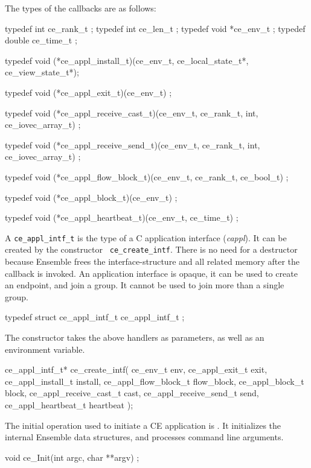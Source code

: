 The types of the callbacks are as follows:
\begin{codebox}
typedef int         ce_rank_t ;
typedef int         ce_len_t ;
typedef void       *ce_env_t ;
typedef double      ce_time_t ;

typedef void (*ce_appl_install_t)(ce_env_t, ce_local_state_t*, ce_view_state_t*);

typedef void (*ce_appl_exit_t)(ce_env_t) ;

typedef void (*ce_appl_receive_cast_t)(ce_env_t, ce_rank_t, int, ce_iovec_array_t) ;

typedef void (*ce_appl_receive_send_t)(ce_env_t, ce_rank_t, int, ce_iovec_array_t) ;

typedef void (*ce_appl_flow_block_t)(ce_env_t, ce_rank_t, ce_bool_t) ;

typedef void (*ce_appl_block_t)(ce_env_t) ;

typedef void (*ce_appl_heartbeat_t)(ce_env_t, ce_time_t) ;
\end{codebox}


A {\tt ce\_appl\_intf\_t} is the type of a C application interface
({\it cappl}).  It can be created by the constructor {\tt
ce\_create\_intf}. There is no need for a destructor because Ensemble
frees the interface-structure and all related memory after the 
callback is invoked. An application interface is opaque, it can be
used to create an endpoint, and join a group. It cannot be used to 
join more than a single group.
\begin{codebox}
typedef struct ce_appl_intf_t ce_appl_intf_t ;
\end{codebox}


The constructor takes the above handlers as parameters, as well as
an environment variable. 

\begin{codebox}
ce_appl_intf_t*
ce_create_intf(
    ce_env_t env, 
    ce_appl_exit_t exit,
    ce_appl_install_t install,
    ce_appl_flow_block_t flow_block,
    ce_appl_block_t block,
    ce_appl_receive_cast_t cast,
    ce_appl_receive_send_t send,
    ce_appl_heartbeat_t heartbeat
);
\end{codebox}

The initial operation used to initiate a CE application is
. It initializes the internal Ensemble data structures, and
processes command line arguments.

\begin{codebox}
void ce_Init(int argc, char **argv) ;
\end{codebox}


